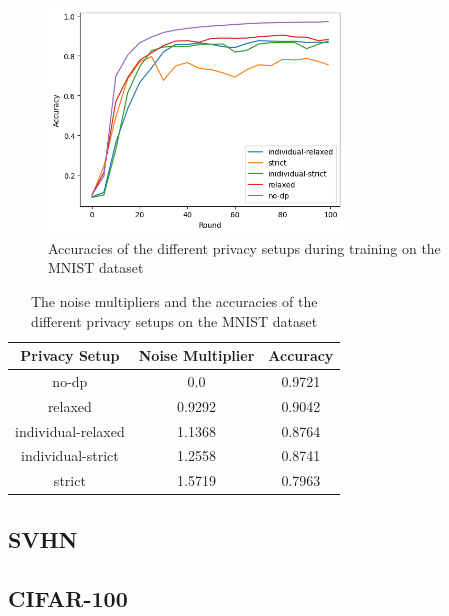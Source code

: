 \begin{figure}
	\centering
	\includegraphics[width=0.7\textwidth]{Bilder/mnist-results.png}
	\caption{Accuracies of the different privacy setups during training on the MNIST dataset}
	\label{fig:federated-mnist-results}
\end{figure}

\begin{table}
	\centering
	\begin{tabular}{|c|c|c|}
		\hline
		Privacy Setup & Noise Multiplier & Accuracy \\
		\hline
		no-dp & 0.0 & 0.9721 \\
		relaxed & 0.9292 & 0.9042 \\
		individual-relaxed & 1.1368 & 0.8764 \\
		individual-strict & 1.2558 & 0.8741 \\
		strict & 1.5719 & 0.7963 \\
		\hline
	\end{tabular}
	\caption{The noise multipliers and the accuracies of the different privacy setups on the MNIST dataset}
	\label{tab:federated-mnist-noise-multiplier}
\end{table}

\subsection{SVHN}

\subsection{CIFAR-100}